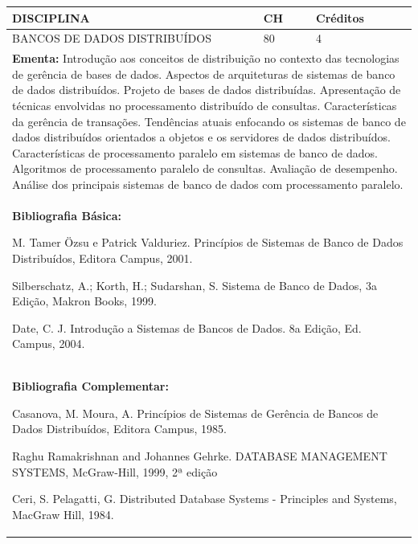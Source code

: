 \documentclass[a4paper, 12pt, openright, oneside, german, french, english, brazil]{abntex2}
\begin{document}
\begin{table}[!h]
  \footnotesize
  \centering
  \begin{tabular}{|p{100mm}|p{10mm}|p{20mm}|}
    \hline
    \textbf{DISCIPLINA} & \textbf{CH} & \textbf{Créditos} \\
    \hline
    BANCOS DE DADOS DISTRIBUÍDOS & 80 & 4 \\
    \hline
    \multicolumn{3}{|p{130mm}|}{\textbf{Ementa:}  Introdução aos conceitos de distribuição no contexto das tecnologias de gerência de bases de dados. Aspectos de arquiteturas de sistemas de banco de dados distribuídos. Projeto de bases de dados distribuídas. Apresentação de técnicas envolvidas no processamento distribuído de consultas. Características da gerência de transações. Tendências atuais enfocando os sistemas de banco de dados distribuídos orientados a objetos e os servidores de dados distribuídos. Características de processamento paralelo em sistemas de banco de dados. Algoritmos de processamento paralelo de consultas. Avaliação de desempenho. Análise dos principais sistemas de banco de dados com processamento paralelo.} \\
    \hline
    \multicolumn{3}{|p{130mm}|}{\textbf{Bibliografia Básica:}

    M. Tamer Özsu e Patrick Valduriez. Princípios de Sistemas de Banco de Dados Distribuídos, Editora Campus, 2001.

Silberschatz, A.; Korth, H.; Sudarshan, S. Sistema de Banco de Dados, 3a Edição, Makron Books, 1999.

Date, C. J. Introdução a Sistemas de Bancos de Dados. 8a Edição, Ed. Campus, 2004.
} \\
    \hline
    \multicolumn{3}{|p{130mm}|}{\textbf{Bibliografia Complementar:}

    Casanova, M. Moura, A. Princípios de Sistemas de Gerência de Bancos de Dados Distribuídos, Editora Campus, 1985.

Raghu Ramakrishnan and Johannes Gehrke. DATABASE MANAGEMENT SYSTEMS, McGraw-Hill, 1999, 2ª edição

Ceri, S. Pelagatti, G. Distributed Database Systems - Principles and Systems, MacGraw Hill, 1984.
} \\
    \hline
  \end{tabular}
\end{table}
\end{document}

